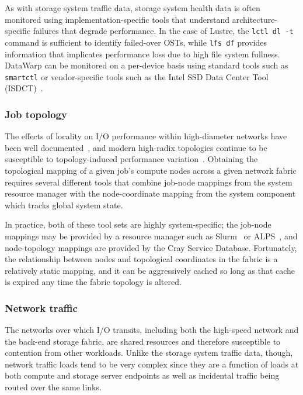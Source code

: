 As with storage system traffic data, storage system health data is often monitored using implementation-specific tools that understand architecture-specific failures that degrade performance.
In the case of Lustre, the \texttt{lctl dl -t} command is sufficient to identify failed-over OSTs, while \texttt{lfs df} provides information that implicates performance loss due to high file system fullness.
DataWarp can be monitored on a per-device basis using standard tools such as \texttt{smartctl} or vendor-specific tools such as the Intel SSD Data Center Tool (ISDCT)~\cite{isdct}.

\subsubsection{Job topology} \label{sec:architecture/components/topology}

The effects of locality on I/O performance within high-diameter networks have been well documented~\cite{Vishwanath2011,Bui2014,Dillow2011}, and modern high-radix topologies continue to be susceptible to topology-induced performance variation~\cite{Mubarak2017}.
Obtaining the topological mapping of a given job's compute nodes across a given network fabric requires several different tools that combine job-node mappings from the system resource manager with the node-coordinate mapping from the system component which tracks global system state.

In practice, both of these tool sets are highly system-specific; the job-node mappings may be provided by a resource manager such as Slurm~\cite{Jacobsen2016} or ALPS~\cite{Karo2006}, and node-topology mappings are provided by the Cray Service Database.
Fortunately, the relationship between nodes and topological coordinates in the fabric is a relatively static mapping, and it can be aggressively cached so long as that cache is expired any time the fabric topology is altered.

\subsubsection{Network traffic} \label{sec:architecture/components/network}

The networks over which I/O transits, including both the high-speed network and the back-end storage fabric, are shared resources and therefore susceptible to contention from other workloads.
Unlike the storage system traffic data, though, network traffic loads tend to be very complex since they are a function of loads at both compute and storage server endpoints as well as incidental traffic being routed over the same links.

